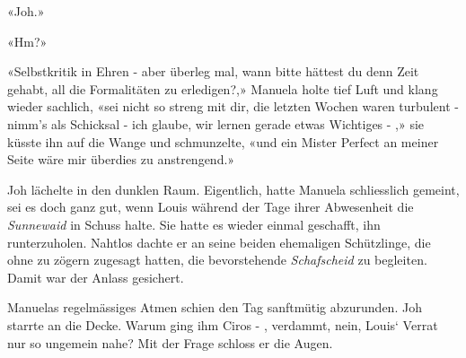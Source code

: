 «Joh.»

«Hm?»

«Selbstkritik in Ehren - aber überleg mal, wann bitte hättest du denn Zeit gehabt, all die Formalitäten zu erledigen?,» Manuela holte tief Luft und klang wieder sachlich, «sei nicht so streng mit dir, die letzten Wochen waren turbulent - nimm's als Schicksal - ich glaube, wir lernen gerade etwas Wichtiges - ,» sie küsste ihn auf die Wange und schmunzelte, «und ein Mister Perfect an meiner Seite wäre mir überdies zu anstrengend.»

Joh lächelte in den dunklen Raum. Eigentlich, hatte Manuela schliesslich gemeint, sei es doch ganz gut, wenn Louis während der Tage ihrer Abwesenheit die \emph{Sunnewaid} in Schuss halte. Sie hatte es wieder einmal geschafft, ihn runterzuholen. Nahtlos dachte er an seine beiden ehemaligen Schützlinge, die ohne zu zögern zugesagt hatten, die bevorstehende  \emph{Schafscheid}  zu begleiten. Damit war der Anlass gesichert.

Manuelas regelmässiges Atmen schien den Tag sanftmütig abzurunden. Joh starrte an die Decke. Warum ging ihm Ciros - , verdammt, nein, Louis` Verrat nur so ungemein nahe? Mit der Frage schloss er die Augen. 









